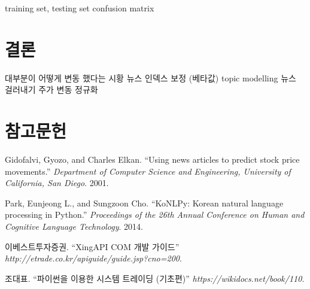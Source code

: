 \documentclass[a4paper,10pt]{article}
\begin{document}
training set, testing set
confusion matrix

\section{결론}

대부분이 어떻게 변동 했다는 시황 뉴스
인덱스 보정 (베타값)
topic modelling 뉴스 걸러내기
주가 변동 정규화

\section*{참고문헌}

\begin{enumerate}[ {[}1{]} ]
\item Gidofalvi, Gyozo, and Charles Elkan. ``Using news articles to predict stock price movements.'' \textit{Department of Computer Science and Engineering, University of California, San Diego}. 2001.
\item Park, Eunjeong L., and Sungzoon Cho. ``KoNLPy: Korean natural language processing in Python.'' \textit{Proceedings of the 26th Annual Conference on Human and Cognitive Language Technology}. 2014.
\item 이베스트투자증권. ``XingAPI COM 개발 가이드'' \textit{http://etrade.co.kr/apiguide/guide.jsp?cno=200}.
\item 조대표. ``파이썬을 이용한 시스템 트레이딩 (기초편)'' \textit{https://wikidocs.net/book/110}.
\end{enumerate}
\end{document}
